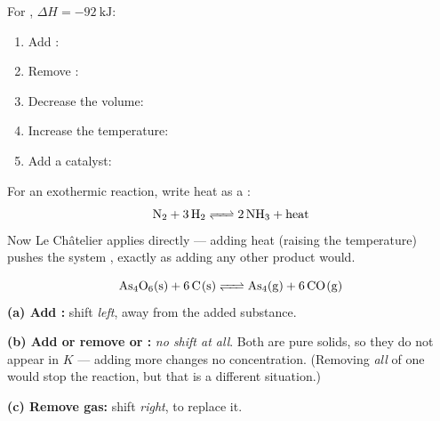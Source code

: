 \documentclass{apchem-notes}
\begin{document}
For , $\Delta H = \SI{-92}{\kilo\joule}$:
\begin{enumerate}[leftmargin=*,itemsep=0.3em]
  \item Add : 
  \item Remove : 
  \item Decrease the volume: 
  \item Increase the temperature:
  \item Add a catalyst: 
\end{enumerate}




For an exothermic reaction, write heat as a :
\[ \ce{N2 + 3 H2 <=> 2 NH3} + \text{heat} \]
Now Le Ch\^{a}telier applies directly --- adding heat (raising the
temperature) pushes the system , exactly as adding
any other product would.

\begin{workedexample}
\[ \ce{As4O6(s) + 6 C(s) <=> As4(g) + 6 CO(g)} \]
\textbf{(a) Add :} shift \emph{left}, away from the added substance.

\textbf{(b) Add or remove  or :} \emph{no shift at all}.
Both are pure solids, so they do not appear in $K$ --- adding more changes
no concentration. (Removing \emph{all} of one would stop the reaction, but
that is a different situation.)

\textbf{(c) Remove  gas:} shift \emph{right}, to replace it.
\end{workedexample}

\end{document}
